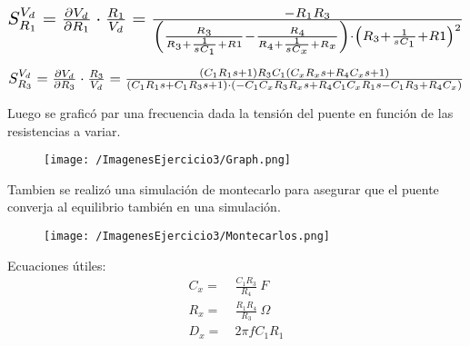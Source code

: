 \begin{align*}
\scalebox{1.5}{$
S_{R_1}^{V_d} = \frac{\partial V_d}{\partial R_1} \cdot \frac{R_1}{V_d}=
\frac{-R_1R_3}{\left( \frac{R_3}{R_3+\frac{1}{sC_1}+R1}-\frac{R_4}{R_4+\frac{1}{sC_x}+R_x} \right) \cdot  \left( R_3+\frac{1}{sC_1}+R1\right)^2}
$}
\end{align*}

\begin{align*}
\scalebox{1.5}{$
S_{R_3}^{V_d} = \frac{\partial V_d}{\partial R_3} \cdot \frac{R_3}{V_d}=\frac{(C_1R_1s+1)R_3C_1(C_xR_xs+R_4C_xs+1)}{(C_1R_1s+C_1R_3s+1)\cdot (-C_1C_xR_3R_xs+R_4C_1C_xR_1s-C_1R_3+R_4C_x)}
$}
\end{align*}


Luego se graficó par una frecuencia dada la tensión del puente en función de las resistencias a variar.
\begin{figure}[H]
	\centering
	\texttt{[image: /ImagenesEjercicio3/Graph.png]}
	\label{fig:graph}
\end{figure}
Tambien se realizó una simulación de montecarlo para asegurar que el puente converja al equilibrio también en una simulación.
\begin{figure}[H]
	\centering
	\texttt{[image: /ImagenesEjercicio3/Montecarlos.png]}
	\label{fig:graph}
\end{figure}
 Ecuaciones útiles:
\begin{equation*}
\begin{split}
	C_{x} =& \ \frac{C_1R_3}{R_4}\ F \\
	R_{x} =& \ \frac{R_1R_4}{R_3}\ \Omega \\
	D_{x} =& \ 2\pi f C_1R_1 
\end{split}
\end{equation*}
